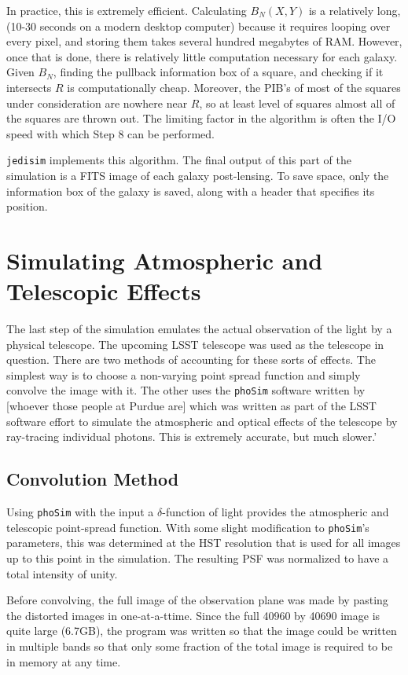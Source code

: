 \documentclass[10pt,twoside]{article}
\theoremstyle{definition}
\theoremstyle{exercise}
\begin{document}
In practice, this is extremely efficient. Calculating $B_N(X,Y)$ is a relatively long, (10-30 seconds on a modern desktop computer) because it requires looping over every pixel, and storing them takes several hundred megabytes of RAM. However, once that is done, there is relatively little computation necessary for each galaxy. Given $B_N$, finding the pullback information box of a square, and checking if it intersects $R$ is computationally cheap. Moreover, the PIB's of most of the squares under consideration are nowhere near $R$, so at least level of squares almost all of the squares are thrown out. The limiting factor in the algorithm is often the I/O speed with which Step 8 can be performed.

\texttt{jedisim} implements this algorithm. The final output of this part of the simulation is a FITS image of each galaxy post-lensing. To save space, only the information box of the galaxy is saved, along with a header that specifies its position.

\section{Simulating Atmospheric and Telescopic Effects}
\label{sec:atmospherics}
The last step of the simulation emulates the actual observation of the light by a physical telescope. The upcoming LSST telescope was used as the telescope in question. There are two methods of accounting for these sorts of effects. The simplest way is to choose a non-varying point spread function and simply convolve the image with it. The other uses the \texttt{phoSim} software written by [whoever those people at Purdue are] which was written as part of the LSST software effort to simulate the atmospheric and optical effects of the telescope by ray-tracing individual photons. This is extremely accurate, but much slower.'

\subsection{Convolution Method}
Using \texttt{phoSim} with the input a $\delta$-function of light provides the atmospheric and telescopic point-spread function. With some slight modification to \texttt{phoSim}'s parameters, this was determined at the HST resolution that is used for all images up to this point in the simulation. The resulting PSF was normalized to have a total intensity of unity.

Before convolving, the full image of the observation plane was made by pasting the distorted images in one-at-a-ttime. Since the full 40960 by 40690 image is quite large (6.7GB), the program was written so that the image could be written in multiple bands so that only some fraction of the total image is required to be in memory at any time.
\end{document}
